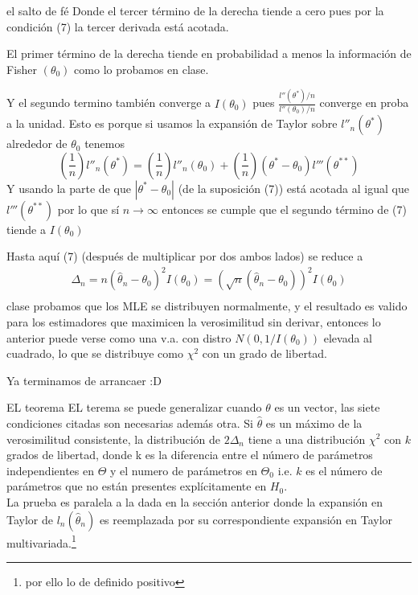 \documentclass{beamer}
\begin{document}
\begin{frame}{el salto de fé}
Donde el tercer término de la derecha tiende a cero pues por la condición (7) la tercer derivada está acotada.

El primer término de la derecha tiende en probabilidad a menos la información de Fisher $(\theta_0)$ como lo probamos en clase.

Y el segundo termino también converge a $I(\theta_0)$ pues $\frac{l''(\theta^*)/n}{ l''(\theta_0)/n }$  converge en proba a la unidad. Esto es porque 
si usamos la expansión de Taylor sobre $l''_n(\theta^*)$ alrededor de $\theta_0$ tenemos
\[
(\frac{1}{n})l''_n(\theta^*) = (\frac{1}{n})l''_n(\theta_0) +(\frac{1}{n}) (\theta^*- \theta_0)l'''(\theta^{**}) 
\]
Y usando la parte de que $|\theta^* - \theta_0|$ (de la suposición (7))  está acotada al igual que $l'''(\theta^{**})$ por lo que sí $n \rightarrow \infty$ entonces se cumple que el segundo término de (7) tiende a $I(\theta_0)$

Hasta aquí (7) (después de multiplicar por dos ambos lados) se reduce a 
\begin{equation}
\begin{split}
\Delta_n = n(\hat{\theta}_n - \theta_0)^2I(\theta_0) = (\sqrt{n}(\hat{\theta}_n - \theta_0))^2I(\theta_0)\\
\end{split}
\end{equation}
\tiny{clase probamos que los MLE se distribuyen normalmente, y el resultado es valido para los estimadores que maximicen la verosimilitud sin derivar, entonces lo anterior puede verse como una v.a. con distro $N(0,1/I(\theta_0)) $ elevada al cuadrado, lo que se distribuye como $\chi^2$ con un grado de libertad.}
\end{frame}

\begin{frame}{Ya terminamos de arrancaer :D}

\end{frame}


\begin{frame}{EL teorema}
EL terema se puede generalizar cuando $\theta$ es un vector, las siete condiciones citadas son necesarias además otra. Si $\hat{\theta}$ es un máximo de la verosimilitud consistente, la distribución de $2\Delta_n$ tiene a una distribución $\chi^2$ con $k$ grados de libertad, donde k es la diferencia entre el número de parámetros independientes en $\Theta$ y el numero de parámetros en $\Theta_0$ i.e. $k$ es el número de parámetros que no están presentes explícitamente en $H_0$. \\
La prueba es paralela a la dada en la sección anterior donde la expansión en Taylor de $l_n(\hat{\theta}_n)$ es reemplazada por su correspondiente expansión en Taylor multivariada.\footnote{por ello lo de definido positivo} 
\begin{center}
\end{center}
\end{frame}
\end{document}
